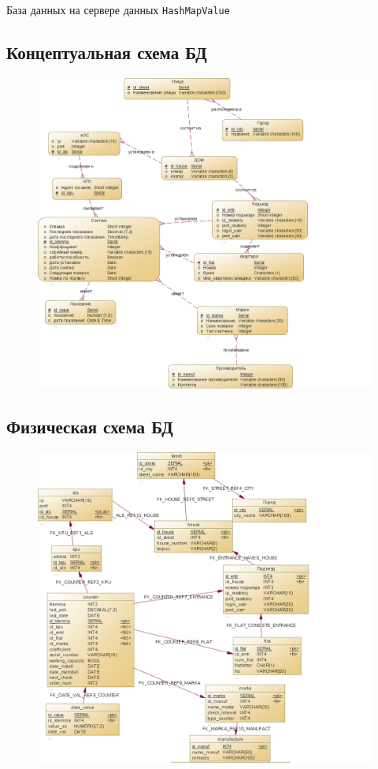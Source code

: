 \documentclass[a4paper,12pt]{article}
\begin{document}
\pagebreak

\begin{center}
База данных на сервере данных \verb|HashMapValue|
\end{center}

\subsection*{Концептуальная схема БД}
\begin{figure}[H]
	\centering
	\includegraphics[width=1.2\linewidth]{pics/pril1} 
\end{figure}

\pagebreak

\subsection*{Физическая схема БД}
\begin{figure}[H]
	\centering
	\includegraphics[width=1.2\linewidth]{pics/pril2} 
\end{figure}
\end{document}
